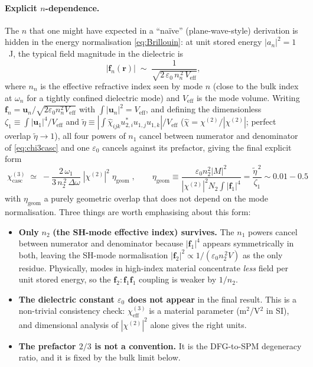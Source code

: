 \documentclass[11pt,a4paper]{article}
\newcommand{\eps}{\varepsilon}
\newcommand{\bvec}[1]{\mathbf{#1}}
\newcommand{\f}{\bvec{f}}
\newcommand{\ri}{\bvec{r}}
\newcommand{\chitwo}{\chi^{(2)}}
\newcommand{\chithree}{\chi^{(3)}}
\newcommand{\Dom}{\Delta\omega}
\begin{document}
\paragraph{Explicit $n$-dependence.}
The $n$ that one might have expected in a ``naïve'' (plane-wave-style)
derivation is hidden in the energy normalisation
\eqref{eq:Brillouin}: at unit stored energy $|a_n|^2=1$~J, the typical
field magnitude in the dielectric is
\begin{equation}
  |\f_n(\ri)|\;\sim\;\frac{1}{\sqrt{2\,\eps_0\,n_n^{\,2}\,V_\text{eff}}},
\end{equation}
where $n_n$ is the effective refractive index seen by mode $n$ (close
to the bulk index at $\omega_n$ for a tightly confined dielectric mode)
and $V_\text{eff}$ is the mode volume.  Writing
$\f_n=\mathbf u_n/\sqrt{2\eps_0n_n^2V_\text{eff}}$ with
$\int|\mathbf u_n|^2=V_\text{eff}$, and defining the dimensionless
$\zeta_1\equiv\int|\mathbf u_1|^4/V_\text{eff}$ and
$\widetilde\eta\equiv|\int\hat\chi_{ijk}u^*_{2,i}u_{1,j}u_{1,k}|/V_\text{eff}$
($\hat\chi=\chitwo/|\chitwo|$; perfect overlap $\widetilde\eta\to 1$),
all four powers of $n_1$ cancel between numerator and denominator of
\eqref{eq:chi3casc} and one $\eps_0$ cancels against its prefactor,
giving the final explicit form
\begin{equation}
  \boxed{\;\chithree_{\text{casc}}\;\simeq\;-\frac{2\,\omega_1}{3\,n_2^{\,2}\,\Dom}\;|\chitwo|^{2}\;\eta_\text{geom}\;,
        \qquad \eta_\text{geom}\equiv\frac{\eps_0n_2^2|M|^2}{|\chitwo|^2N_2\!\int\!|\f_1|^4}
        =\frac{\widetilde\eta^{\,2}}{\zeta_1}\sim 0.01\!-\!0.5\;}
\label{eq:chi3casc_explicit}
\end{equation}
with $\eta_\text{geom}$ a purely geometric overlap that does not depend
on the mode normalisation.  Three things are worth emphasising about
this form:
\begin{itemize}
  \item \textbf{Only} $n_2$ \textbf{(the SH-mode effective index) survives.}
        The $n_1$ powers cancel between numerator and denominator
        because $|\f_1|^4$ appears symmetrically in both, leaving the
        SH-mode normalisation $|\f_2|^2\propto 1/(\eps_0 n_2^{\,2}V)$
        as the only residue.  Physically, modes in high-index material
        concentrate \emph{less} field per unit stored energy, so the
        $\f_2{:}\f_1\f_1$ coupling is weaker by $1/n_2$.
  \item \textbf{The dielectric constant $\eps_0$ does not appear} in the
        final result.  This is a non-trivial consistency check: $\chi^{(3)}_\text{eff}$
        is a material parameter (m$^2$/V$^2$ in SI), and dimensional
        analysis of $|\chitwo|^{2}$ alone gives the right units.
  \item \textbf{The prefactor $2/3$ is not a convention.}  It is the
        DFG-to-SPM degeneracy ratio, and it is fixed by the bulk limit
        below.
\end{itemize}
\end{document}
